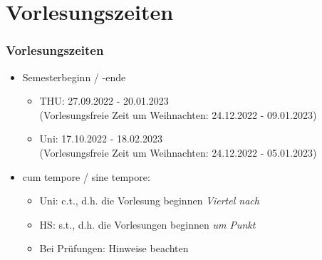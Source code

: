 \documentclass[10pt,a4paper]{beamer}
\begin{document}
    \begin{frame}
        \begin{center}
        \end{center}
    \end{frame}


    \section{Vorlesungszeiten}
    \begin{frame}
        \frametitle{Vorlesungszeiten}
        \begin{itemize}
            \setlength{\itemsep}{10pt} %
            \item Semesterbeginn / -ende

            \begin{itemize}
                \setlength{\itemsep}{10pt} %
                \item THU: 27.09.2022 - 20.01.2023 \\ (Vorlesungsfreie Zeit um Weihnachten: 24.12.2022 - 09.01.2023)
                \item Uni: 17.10.2022 - 18.02.2023\\(Vorlesungsfreie Zeit um Weihnachten: 24.12.2022 - 05.01.2023)
            \end{itemize}

            \item cum tempore / sine tempore:
            \begin{itemize}
                \setlength{\itemsep}{10pt} %
                \item Uni: c.t., d.h. die Vorlesung beginnen \emph{Viertel nach}
                \item HS: s.t., d.h. die Vorlesungen beginnen \emph{um Punkt}
                \item Bei Prüfungen: Hinweise beachten
            \end{itemize}
        \end{itemize}
    \end{frame}
\end{document}
